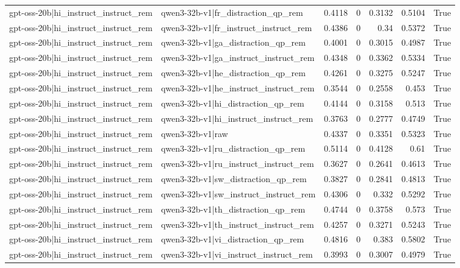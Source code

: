 \begin{table}
\begin{tabular}{l l r r r r l}
gpt-oss-20b|hi_instruct_instruct_rem & qwen3-32b-v1|fr_distraction_qp_rem & 0.4118 & 0 & 0.3132 & 0.5104 & True \\
gpt-oss-20b|hi_instruct_instruct_rem & qwen3-32b-v1|fr_instruct_instruct_rem & 0.4386 & 0 & 0.34 & 0.5372 & True \\
gpt-oss-20b|hi_instruct_instruct_rem & qwen3-32b-v1|ga_distraction_qp_rem & 0.4001 & 0 & 0.3015 & 0.4987 & True \\
gpt-oss-20b|hi_instruct_instruct_rem & qwen3-32b-v1|ga_instruct_instruct_rem & 0.4348 & 0 & 0.3362 & 0.5334 & True \\
gpt-oss-20b|hi_instruct_instruct_rem & qwen3-32b-v1|he_distraction_qp_rem & 0.4261 & 0 & 0.3275 & 0.5247 & True \\
gpt-oss-20b|hi_instruct_instruct_rem & qwen3-32b-v1|he_instruct_instruct_rem & 0.3544 & 0 & 0.2558 & 0.453 & True \\
gpt-oss-20b|hi_instruct_instruct_rem & qwen3-32b-v1|hi_distraction_qp_rem & 0.4144 & 0 & 0.3158 & 0.513 & True \\
gpt-oss-20b|hi_instruct_instruct_rem & qwen3-32b-v1|hi_instruct_instruct_rem & 0.3763 & 0 & 0.2777 & 0.4749 & True \\
gpt-oss-20b|hi_instruct_instruct_rem & qwen3-32b-v1|raw & 0.4337 & 0 & 0.3351 & 0.5323 & True \\
gpt-oss-20b|hi_instruct_instruct_rem & qwen3-32b-v1|ru_distraction_qp_rem & 0.5114 & 0 & 0.4128 & 0.61 & True \\
gpt-oss-20b|hi_instruct_instruct_rem & qwen3-32b-v1|ru_instruct_instruct_rem & 0.3627 & 0 & 0.2641 & 0.4613 & True \\
gpt-oss-20b|hi_instruct_instruct_rem & qwen3-32b-v1|sw_distraction_qp_rem & 0.3827 & 0 & 0.2841 & 0.4813 & True \\
gpt-oss-20b|hi_instruct_instruct_rem & qwen3-32b-v1|sw_instruct_instruct_rem & 0.4306 & 0 & 0.332 & 0.5292 & True \\
gpt-oss-20b|hi_instruct_instruct_rem & qwen3-32b-v1|th_distraction_qp_rem & 0.4744 & 0 & 0.3758 & 0.573 & True \\
gpt-oss-20b|hi_instruct_instruct_rem & qwen3-32b-v1|th_instruct_instruct_rem & 0.4257 & 0 & 0.3271 & 0.5243 & True \\
gpt-oss-20b|hi_instruct_instruct_rem & qwen3-32b-v1|vi_distraction_qp_rem & 0.4816 & 0 & 0.383 & 0.5802 & True \\
gpt-oss-20b|hi_instruct_instruct_rem & qwen3-32b-v1|vi_instruct_instruct_rem & 0.3993 & 0 & 0.3007 & 0.4979 & True \\

\end{tabular}
\end{table}
